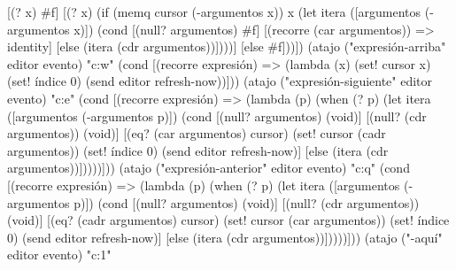 \documentclass[letterpaper, twoside, openright, 11pt]{book}%
\begin{document}
{{                      [(? x) #f]
                      [(? x)
                       (if (memq cursor (-argumentos x))
                           x
                           (let itera ([argumentos (-argumentos x)])
                             (cond [(null? argumentos) #f]
                                   [(recorre (car argumentos))
                                    => identity]
                                   [else (itera (cdr argumentos))])))]
                      [else #f]))])
      (atajo ("expresión-arriba" editor evento) "c:w"
             (cond [(recorre expresión)
                    => (lambda (x)
                         (set! cursor x)
                         (set! índice 0)
                         (send editor refresh-now))]))
      (atajo ("expresión-siguiente" editor evento) "c:e"
             (cond [(recorre expresión)
                    => (lambda (p)
                         (when (? p)
                           (let itera ([argumentos (-argumentos p)])
                             (cond [(null? argumentos) (void)]
                                   [(null? (cdr argumentos)) (void)]
                                   [(eq? (car argumentos) cursor)
                                    (set! cursor (cadr argumentos))
                                    (set! índice 0)
                                    (send editor refresh-now)]
                                   [else (itera (cdr argumentos))]))))]))
      (atajo ("expresión-anterior" editor evento) "c:q"
             (cond [(recorre expresión)
                    => (lambda (p)
                         (when (? p)
                           (let itera ([argumentos (-argumentos p)])
                             (cond [(null? argumentos) (void)]
                                   [(null? (cdr argumentos)) (void)]
                                   [(eq? (cadr argumentos) cursor)
                                    (set! cursor (car argumentos))
                                    (set! índice 0)
                                    (send editor refresh-now)]
                                   [else (itera (cdr argumentos))]))))]))
      (atajo ("-aquí" editor evento) "c:1"
}}
\end{document}
